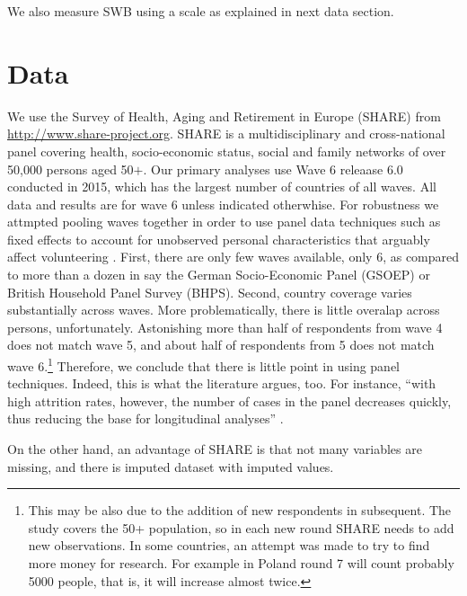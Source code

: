 \documentclass[10pt, letterpaper]{article}
\begin{document}
\begin{spacing}{1.4}
We also measure SWB using a scale as explained in next data section.

\section{Data} 

We use the Survey of Health, Aging and Retirement in Europe (SHARE) from
\url{http://www.share-project.org}.
 SHARE is a multidisciplinary and
cross-national panel covering health, socio-economic status,
social and family networks of over 50,000 persons aged 50$+$. Our primary
analyses use %
 Wave 6 releaase 6.0
 conducted  in 2015, which has the largest number of
countries of all waves.  All data and results are for wave 6 unless indicated otherwhise.
For robustness we attmpted pooling waves together in order to use panel data
techniques such as fixed effects to account for unobserved personal
characteristics that arguably affect volunteering \citep{meier08}. 
First, there are only few waves available, only 6,  as compared to more than a
dozen in say the German Socio-Economic Panel (GSOEP) or British Household Panel
Survey (BHPS). Second, country coverage varies substantially across waves.
 More problematically, there is little overalap across persons, unfortunately.
Astonishing more than half of respondents from wave 4 does not match wave 5, and
about half of respondents from 5 does not match wave 6.\footnote{%
This may be also due
  to the addition of new respondents in subsequent. The study covers the 50+ population,
  so in each new round SHARE needs to add new observations. In some
  countries, an attempt was made to try to find more money for research. For
  example in Poland round 7 will count probably 5000 people, that is, it will
  increase almost twice.}  Therefore, we conclude
that there is little point in using panel techniques.
%
Indeed, this is what the literature argues, too. For instance, ``with 
high attrition rates, however, the number of cases  in the panel decreases quickly, 
thus  reducing  the  base  for  longitudinal  analyses'' \citep{blom2011sample}. 

On the other hand, an advantage of SHARE is that not many variables are missing,
and there is imputed dataset with imputed values. %
                                

\end{spacing}
\end{document}
